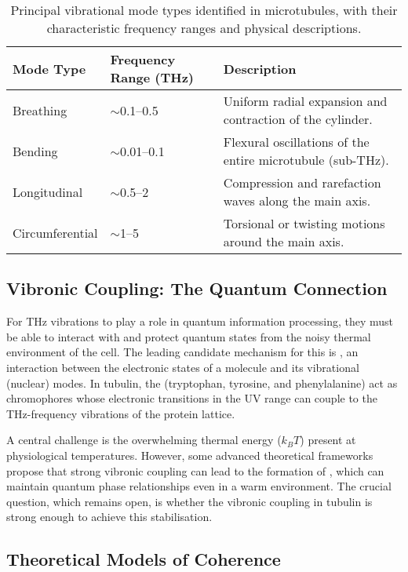 \begin{table}[ht]
    \centering
    \caption{Principal vibrational mode types identified in microtubules, with their characteristic frequency ranges and physical descriptions.}
    \label{tab:mt-modes}
    \begin{tabular}{@{}lll@{}}
        \toprule
        \textbf{Mode Type} & \textbf{Frequency Range (THz)} & \textbf{Description} \\
        \midrule
        Breathing & \(\sim\)0.1--0.5 & Uniform radial expansion and contraction of the cylinder. \\
        Bending & \(\sim\)0.01--0.1 & Flexural oscillations of the entire microtubule (sub-THz). \\
        Longitudinal & \(\sim\)0.5--2 & Compression and rarefaction waves along the main axis. \\
        Circumferential & \(\sim\)1--5 & Torsional or twisting motions around the main axis. \\
        \bottomrule
    \end{tabular}
\end{table}

\subsection{Vibronic Coupling: The Quantum Connection}

For THz vibrations to play a role in quantum information processing, they must be able to interact with and protect quantum states from the noisy thermal environment of the cell. The leading candidate mechanism for this is , an interaction between the electronic states of a molecule and its vibrational (nuclear) modes. In tubulin, the  (tryptophan, tyrosine, and phenylalanine) act as chromophores whose electronic transitions in the UV range can couple to the THz-frequency vibrations of the protein lattice.

A central challenge is the overwhelming thermal energy (\(k_B T\)) present at physiological temperatures. However, some advanced theoretical frameworks propose that strong vibronic coupling can lead to the formation of , which can maintain quantum phase relationships even in a warm environment. The crucial question, which remains open, is whether the vibronic coupling in tubulin is strong enough to achieve this stabilisation.

\subsection{Theoretical Models of Coherence}

